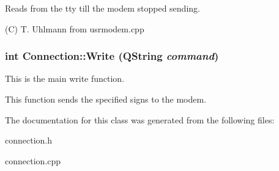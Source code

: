 Reads from the tty till the modem stopped sending. 

(C) T. Uhlmann from usrmodem.cpp 
\subsubsection{\setlength{\rightskip}{0pt plus 5cm}int Connection::Write (QString {\em command})}\label{classConnection_a3}


This is the main write function. 

This function sends the specified signs to the modem. 

The documentation for this class was generated from the following files:\begin{CompactItemize}
\item 
connection.h\item 
connection.cpp\end{CompactItemize}
